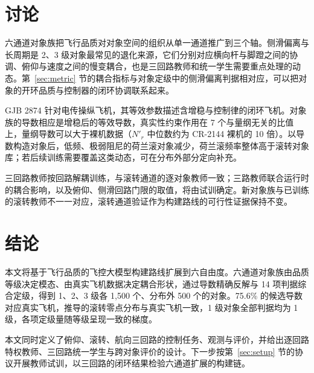 \documentclass[UTF8,a4paper,11pt,fontset=fandol,scheme=plain]{ctexart}
\begin{document}
\section{讨论}
\label{sec:discussion}
六通道对象族把飞行品质对对象空间的组织从单一通道推广到三个轴。侧滑偏离与长周期是 2、3 级对象最常见的退化来源，它们分别对应横向杆与脚蹬之间的协调、俯仰与速度之间的慢变耦合，也是三回路教师和统一学生需要重点处理的动态。第~\ref{sec:metric} 节的耦合指标与对象定级中的侧滑偏离判据相对应，可以把对象的开环品质与控制器的闭环协调联系起来。

GJB 2874 针对电传操纵飞机，其等效参数描述含增稳与控制律的闭环飞机。对象族的导数相应是增稳后的等效导数，真实性约束作用在 7 个与量纲无关的比值上，量纲导数可以大于裸机数据（\(N'_r\) 中位数约为 CR-2144 裸机的 10 倍）。以导数构造对象后，低频、极弱阻尼的荷兰滚对象减少，荷兰滚频率整体高于滚转对象库；若后续训练需要覆盖这类动态，可在分布外部分定向补充。

三回路教师按回路解耦训练，与滚转通道的逐对象教师一致；三路教师联合运行时的耦合影响，以及俯仰、侧滑回路门限的取值，将由试训确定。新对象族与已训练的滚转教师不一一对应，滚转通道验证作为构建路线的可行性证据保持不变。

\section{结论}
\label{sec:conclusion}
本文将基于飞行品质的飞控大模型构建路线扩展到六自由度。六通道对象族由品质等级决定模态、由真实飞机数据决定耦合形状，通过导数精确反解与 14 项判据综合定级，得到 1、2、3 级各 1,500 个、分布外 500 个的对象。75.6\% 的候选导数对应真实飞机，推导的滚转零点分布与真实飞机一致，1 级对象全部判据均为 1 级，各项定级量随等级呈现一致的梯度。

本文同时定义了俯仰、滚转、航向三回路的控制任务、观测与评价，并给出逐回路特权教师、三回路统一学生与跨对象评价的设计。下一步按第~\ref{sec:setup} 节的协议开展教师试训，以三回路的闭环结果检验六通道扩展的构建链。
\end{document}
